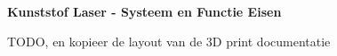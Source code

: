 \documentclass{article}
\begin{document}
\pagestyle{empty}

\begin{center}
  \Large \textbf{Kunststof Laser - Systeem en Functie Eisen}
\end{center}

TODO, en kopieer de layout van de 3D print documentatie
\end{document}
